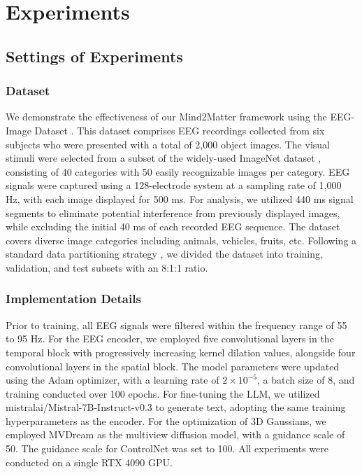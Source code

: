 \documentclass[sigconf]{acmart}
\begin{document}
\section{Experiments}
\subsection{Settings of Experiments}
\subsubsection*{\textbf{Dataset}}
We demonstrate the effectiveness of our Mind2Matter framework using the EEG-Image Dataset \cite{spampinato2017deep}. This dataset comprises EEG recordings collected from six subjects who were presented with a total of 2,000 object images. The visual stimuli were selected from a subset of the widely-used ImageNet dataset \cite{russakovsky2015imagenet}, consisting of 40 categories with 50 easily recognizable images per category. EEG signals were captured using a 128-electrode system at a sampling rate of 1,000 Hz, with each image displayed for 500 ms. For analysis, we utilized 440 ms signal segments to eliminate potential interference from previously displayed images, while excluding the initial 40 ms of each recorded EEG sequence. The dataset covers diverse image categories including animals, vehicles, fruits, etc. Following a standard data partitioning strategy \cite{kavasidis2017brain2image}, we divided the dataset into training, validation, and test subsets with an 8:1:1 ratio.

\subsubsection*{\textbf{Implementation Details}}
Prior to training, all EEG signals were filtered within the frequency range of 55 to 95 Hz. For the EEG encoder, we employed five convolutional layers in the temporal block with progressively increasing kernel dilation values, alongside four convolutional layers in the spatial block. The model parameters were updated using the Adam optimizer, with a learning rate of $2 \times 10^{-5}$, a batch size of 8, and training conducted over 100 epochs. For fine-tuning the LLM, we utilized mistralai/Mistral-7B-Instruct-v0.3 to generate text, adopting the same training hyperparameters as the encoder. For the optimization of 3D Gaussians, we employed MVDream \cite{shi2023mvdream} as the multiview diffusion model, with a guidance scale of 50. The guidance scale for ControlNet was set to 100. All experiments were conducted on a single  RTX 4090 GPU.
\end{document}
